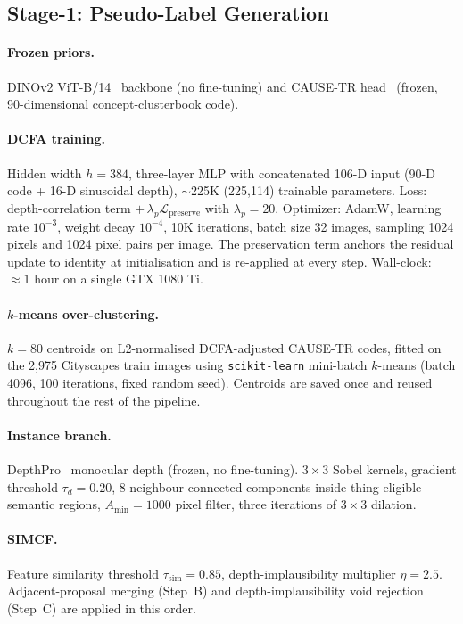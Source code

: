 \documentclass{article}
\begin{document}
\subsection{Stage-1: Pseudo-Label Generation}
\label{sec:supp:impl:stage1}

\paragraph{Frozen priors.}
DINOv2 ViT-B/14~\cite{oquab2024dinov2} backbone (no fine-tuning) and CAUSE-TR head~\cite{kim2024cause} (frozen, 90-dimensional concept-clusterbook code).

\paragraph{DCFA training.}
Hidden width $h{=}384$, three-layer MLP with concatenated 106-D input (90-D code + 16-D sinusoidal depth), $\sim$225K (225,114) trainable parameters. Loss: depth-correlation term $+\,\lambda_p \mathcal{L}_\text{preserve}$ with $\lambda_p{=}20$. Optimizer: AdamW, learning rate $10^{-3}$, weight decay $10^{-4}$, 10K iterations, batch size 32 images, sampling 1024 pixels and 1024 pixel pairs per image. The preservation term anchors the residual update to identity at initialisation and is re-applied at every step. Wall-clock: $\approx 1$ hour on a single GTX 1080 Ti.

\paragraph{$k$-means over-clustering.}
$k{=}80$ centroids on L2-normalised DCFA-adjusted CAUSE-TR codes, fitted on the 2{,}975 Cityscapes train images using \texttt{scikit-learn} mini-batch $k$-means (batch 4096, 100 iterations, fixed random seed). Centroids are saved once and reused throughout the rest of the pipeline.

\paragraph{Instance branch.}
DepthPro~\cite{bochkovskii2024depthpro} monocular depth (frozen, no fine-tuning). $3\times3$ Sobel kernels, gradient threshold $\tau_d{=}0.20$, 8-neighbour connected components inside thing-eligible semantic regions, $A_\text{min}{=}1000$ pixel filter, three iterations of $3\times3$ dilation.

\paragraph{SIMCF.}
Feature similarity threshold $\tau_\text{sim}{=}0.85$, depth-implausibility multiplier $\eta{=}2.5$. Adjacent-proposal merging (Step~B) and depth-implausibility void rejection (Step~C) are applied in this order.
\end{document}
